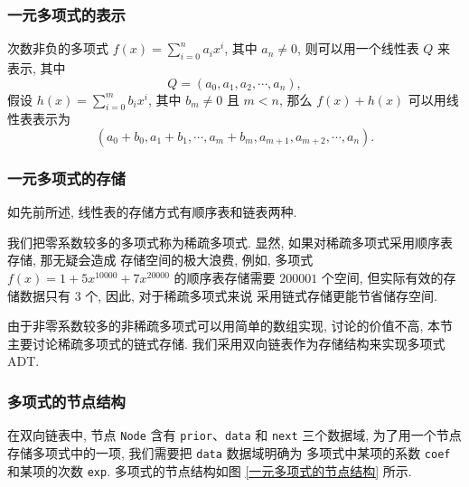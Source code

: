 \documentclass[10pt,UTF8]{book} %
\begin{document}
\subsubsection{一元多项式的表示}

次数非负的多项式 $f(x) = \sum_{i=0}^n a_ix^i$, 其中 $a_n \ne 0$, 则可以用一个线性表 $Q$ 来表示, 其中
\[ Q = \left(a_0, a_1, a_2, \cdots, a_n \right), \]
假设 $h(x) = \sum_{i=0}^m b_ix^i$, 其中 $b_m \ne 0$ 且 $m<n$, 那么 $f(x) + h(x)$
可以用线性表表示为
\[ \left(a_0 + b_0, a_1 + b_1, \cdots, a_m+b_m, a_{m+1}, a_{m+2}, \cdots, a_n\right). \]

\subsubsection{一元多项式的存储}

如先前所述, 线性表的存储方式有顺序表和链表两种.

我们把零系数较多的多项式称为稀疏多项式. 显然, 如果对稀疏多项式采用顺序表存储, 那无疑会造成
存储空间的极大浪费, 例如, 多项式
$f(x) = 1 + 5x^{10000} + 7x^{20000}$
的顺序表存储需要 $200001$ 个空间, 但实际有效的存储数据只有 $3$ 个, 因此, 对于稀疏多项式来说
采用链式存储更能节省储存空间.

由于非零系数较多的非稀疏多项式可以用简单的数组实现, 讨论的价值不高, 本节主要讨论稀疏多项式的链式存储.
我们采用双向链表作为存储结构来实现多项式 ADT.

\subsubsection{多项式的节点结构}

在双向链表中, 节点 \lstinline|Node| 含有 \lstinline|prior|、\lstinline|data| 和
\lstinline|next| 三个数据域, 为了用一个节点存储多项式中的一项, 
我们需要把 \lstinline|data| 数据域明确为
多项式中某项的系数 \lstinline|coef| 和某项的次数 \lstinline|exp|.
多项式的节点结构如图 \ref{一元多项式的节点结构} 所示.
\end{document}
